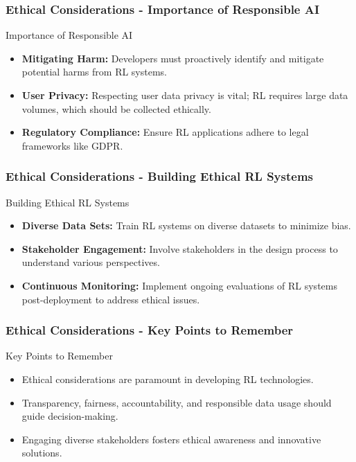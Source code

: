 \documentclass{beamer}
\begin{document}
\begin{frame}[fragile]
    \frametitle{Ethical Considerations - Importance of Responsible AI}
    \begin{block}{Importance of Responsible AI}
        \begin{itemize}
            \item \textbf{Mitigating Harm:} Developers must proactively identify and mitigate potential harms from RL systems.
            \item \textbf{User Privacy:} Respecting user data privacy is vital; RL requires large data volumes, which should be collected ethically.
            \item \textbf{Regulatory Compliance:} Ensure RL applications adhere to legal frameworks like GDPR.
        \end{itemize}
    \end{block}
\end{frame}

\begin{frame}[fragile]
    \frametitle{Ethical Considerations - Building Ethical RL Systems}
    \begin{block}{Building Ethical RL Systems}
        \begin{itemize}
            \item \textbf{Diverse Data Sets:} Train RL systems on diverse datasets to minimize bias.
            \item \textbf{Stakeholder Engagement:} Involve stakeholders in the design process to understand various perspectives.
            \item \textbf{Continuous Monitoring:} Implement ongoing evaluations of RL systems post-deployment to address ethical issues.
        \end{itemize}
    \end{block}
\end{frame}

\begin{frame}[fragile]
    \frametitle{Ethical Considerations - Key Points to Remember}
    \begin{block}{Key Points to Remember}
        \begin{itemize}
            \item Ethical considerations are paramount in developing RL technologies.
            \item Transparency, fairness, accountability, and responsible data usage should guide decision-making.
            \item Engaging diverse stakeholders fosters ethical awareness and innovative solutions.
        \end{itemize}
    \end{block}
\end{frame}
\end{document}
